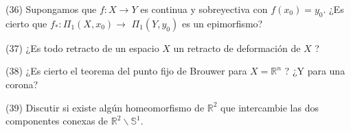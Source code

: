 \documentclass[
  a4paper,
  spanish,
  12pt,
]{scrartcl}
\begin{document}
\begin{ejer}
(36) Supongamos que $f: X \rightarrow Y$ es continua y sobreyectiva con $f\left(x_{0}\right)=y_{0}$. ¿Es cierto que $f_{*}: \Pi_{1}\left(X, x_{0}\right) \rightarrow$ $\Pi_{1}\left(Y, y_{0}\right)$ es un epimorfismo?\\
\end{ejer}

\begin{ejer}
(37) ¿Es todo retracto de un espacio $X$ un retracto de deformación de $X$ ?\\
\end{ejer}

\begin{ejer}
(38) ¿Es cierto el teorema del punto fijo de Brouwer para $X=\mathbb{R}^{n}$ ? ¿Y para una corona?\\
\end{ejer}

\begin{ejer}
(39) Discutir si existe algún homeomorfismo de $\mathbb{R}^{2}$ que intercambie las dos componentes conexas de $\mathbb{R}^{2} \backslash \mathbb{S}^{1}$.
\end{ejer}
\end{document}

